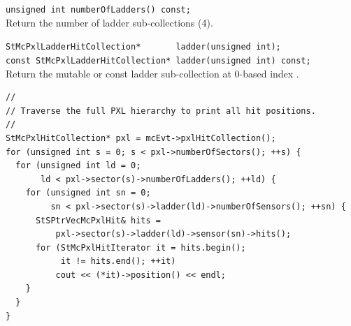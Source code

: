 \begin{Entry}
    \verb+unsigned int numberOfLadders() const;+\\
    Return the number of ladder sub-collections (4).

    \verb+StMcPxlLadderHitCollection*       ladder(unsigned int);+\\
    \verb+const StMcPxlLadderHitCollection* ladder(unsigned int) const;+\\
    Return the mutable or const ladder sub-collection at 0-based index
    .

\item[Examples]
{\footnotesize
\begin{verbatim}
//
// Traverse the full PXL hierarchy to print all hit positions.
//
StMcPxlHitCollection* pxl = mcEvt->pxlHitCollection();
for (unsigned int s = 0; s < pxl->numberOfSectors(); ++s) {
  for (unsigned int ld = 0;
       ld < pxl->sector(s)->numberOfLadders(); ++ld) {
    for (unsigned int sn = 0;
         sn < pxl->sector(s)->ladder(ld)->numberOfSensors(); ++sn) {
      StSPtrVecMcPxlHit& hits =
          pxl->sector(s)->ladder(ld)->sensor(sn)->hits();
      for (StMcPxlHitIterator it = hits.begin();
           it != hits.end(); ++it)
          cout << (*it)->position() << endl;
    }
  }
}
\end{verbatim}
}%
\end{Entry}
\clearpage

%
%
